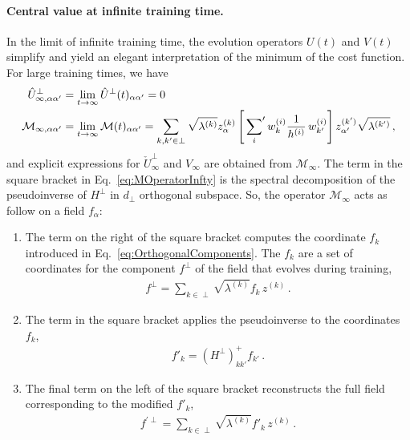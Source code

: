 \paragraph{Central value at infinite training time.}

In the limit of infinite training time, the evolution operators $U(t)$ and $V(t)$ simplify and yield an 
elegant interpretation of the minimum of the cost function. For large training times, we have
\begin{align}
    \label{eq:UhatInfty}
    \hat{U}^\perp_{\infty, \alpha\alpha'}
        &= \lim_{t\to\infty}\hat{U}^\perp(t)_{\alpha\alpha'} = 0\, \\
    \label{eq:MOperatorInfty}
    \mathcal{M}_{\infty, \alpha\alpha'} 
        &= \lim_{t\to\infty}\mathcal{M}(t)_{\alpha\alpha'} = \sum_{k,k'\in\perp} \sqrt{\lambda^{(k)}} z^{(k)}_\alpha 
        \left[\sideset{}{'}\sum_{i} w^{(i)}_{k} \frac{1}{h^{(i)}}\, 
        w^{(i)}_{k'}\right] z^{(k')}_{\alpha'} \sqrt{\lambda^{(k')}}\, ,
\end{align}
and explicit expressions for $\check{U}^\perp_{\infty}$ and $V_{\infty}$ are obtained from $\mathcal{M}_{\infty}$.
The term in the square bracket in Eq.~\eqref{eq:MOperatorInfty} is the spectral decomposition of the pseudoinverse 
of $H^\perp$ in $d_\perp$ orthogonal subspace. So, the operator $\mathcal{M}_{\infty}$ acts as follow on a field 
$f_{\alpha}$:
\begin{enumerate}
    \item The term on the right of the square bracket computes the coordinate $f_k$ introduced in 
    Eq.~\eqref{eq:OrthogonalComponents}. The $f_k$ are a set of coordinates for the component $f^\perp$ 
    of the field that evolves during training, 
    \begin{align}
        \label{eq:RightOfTheBracket}
        f^\perp = \sum_{k\in\perp} \sqrt{\lambda^{(k)}} f_k\, z^{(k)}\,  .
    \end{align}
    \item The term in the square bracket applies the pseudoinverse to the coordinates $f_k$, 
    \begin{align}
        \label{eq:ApplyPseudoInv}
        f'_k = \left(H^\perp\right)^+_{kk'} f_{k'}\, .
    \end{align}
    \item The final term on the left of the square bracket reconstructs the full field corresponding to the modified 
    $f'_{k}$,
    \begin{align}
        \label{eq:LeftOfTheBracket}
        f^{'\perp} = \sum_{k\in\perp} \sqrt{\lambda^{(k)}} f'_{k}\, z^{(k)}\, .
    \end{align}
    
\end{enumerate}

